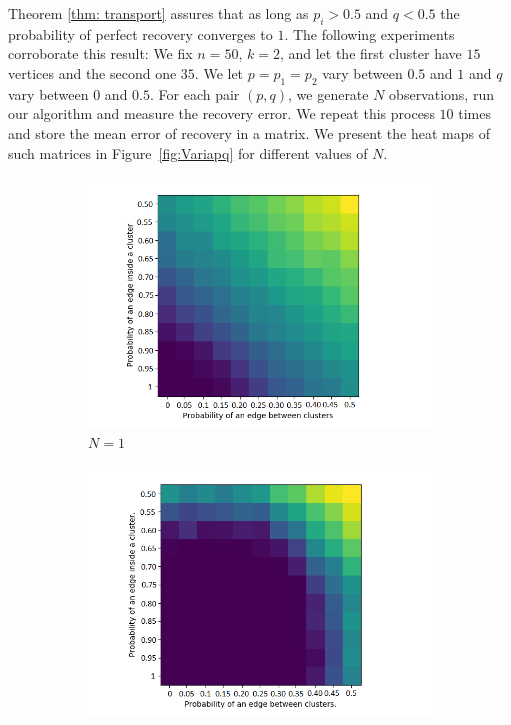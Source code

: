 \documentclass[12pt]{amsart}
\theoremstyle{remark}
\begin{document}
Theorem \ref{thm: transport} assures that as long as $p_i > 0.5$ and $q< 0.5$ the probability of perfect recovery converges to $1$. The following experiments corroborate this result:
We fix $n=50$, $k=2$, and let the first cluster have $15$ vertices and the second one $35$. We let $p =  p_1 = p_2$ vary between $0.5$ and $1$ and $q$ vary between $0$ and $0.5$.  For each pair $(p,q)$, we generate $N$ observations, run our algorithm and measure the recovery error. We repeat this process $10$ times and store the mean error of recovery in a matrix.
We present the heat maps of such matrices in Figure~\ref{fig:Variapq} for different values of $N$. 


\begin{figure}
     \centering
     \begin{subfigure}[b]{0.5\textwidth}
         \centering
         \includegraphics[width=\textwidth]{./Pictures/Variapq1.PNG}
         \caption{$N=1$}
     \end{subfigure}
     \hfill
     \begin{subfigure}[b]{0.5\textwidth}
         \centering
         \includegraphics[width=\textwidth]{./Pictures/Variapq3.PNG}

\end{subfigure}
\end{figure}
\end{document}

